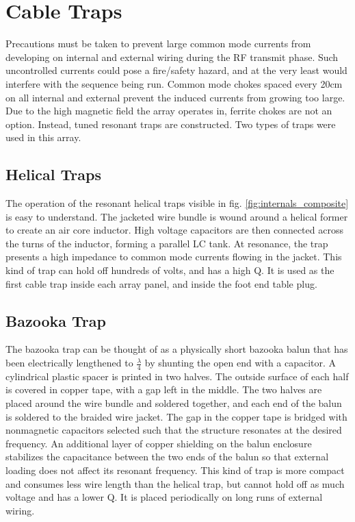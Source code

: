 \section{Cable Traps}
Precautions must be taken to prevent large common mode currents from developing on internal and external wiring during the RF
transmit phase. Such uncontrolled currents could pose a fire/safety hazard, and at the very least would interfere with
the sequence being run. Common mode chokes spaced every 20cm on all internal and external prevent the induced currents
from growing too large. Due to the high magnetic field the array operates in, ferrite chokes are not an option. Instead,
tuned resonant traps are constructed. Two types of traps were used in this array.

\subsection{Helical Traps}
The operation of the resonant helical traps visible in fig. \ref{fig:internals_composite} is easy to understand.  The
jacketed wire bundle is wound around a helical former to create an air core inductor. High voltage capacitors are then
connected across the turns of the inductor, forming a parallel LC tank. At resonance, the trap presents a high impedance
to common mode currents flowing in the jacket.  This kind of trap can hold off hundreds of volts, and has a high Q. It
is used as the first cable trap inside each array panel, and inside the foot end table plug.

\subsection{Bazooka Trap}
The bazooka trap can be thought of as a physically short bazooka balun that has been electrically lengthened to
$\frac{\lambda}{4}$ by shunting the open end with a capacitor. A cylindrical plastic spacer is printed in two halves.
The outside surface of each half is covered in copper tape, with a gap left in the middle. The two halves are placed
around the wire bundle and soldered together, and each end of the balun is soldered to the braided wire jacket. The gap
in the copper tape is bridged with nonmagnetic capacitors selected such that the structure resonates at the desired
frequency. An additional layer of copper shielding on the balun enclosure stabilizes the capacitance between the two
ends of the balun so that external loading does not affect its resonant frequency.  This kind of trap is more compact
and consumes less wire length than the helical trap, but cannot hold off as much voltage and has a lower Q. It is
placed periodically on long runs of external wiring.

